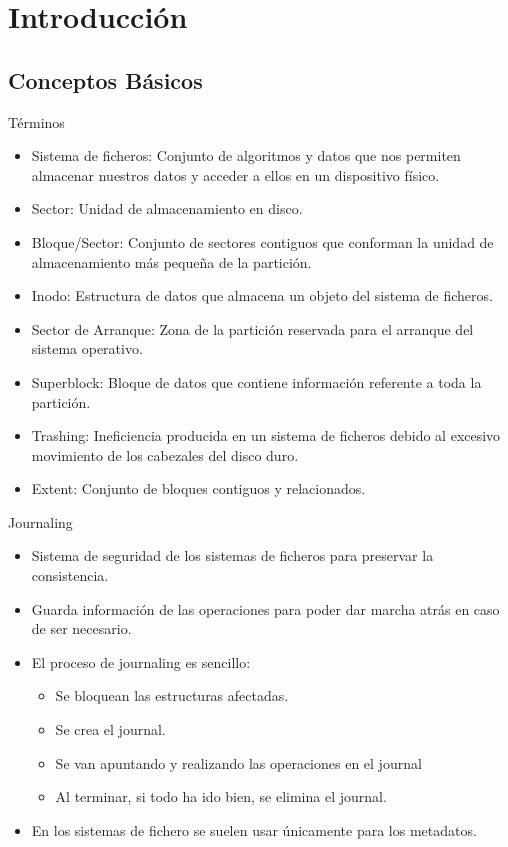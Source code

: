 \section*{Introducción}
\subsection*{Conceptos Básicos}
\begin{frame}{Términos}
  \begin{itemize}
    \item Sistema de ficheros: Conjunto de algoritmos y datos que nos permiten almacenar nuestros datos y acceder a ellos en un dispositivo físico.
    \item Sector: Unidad de almacenamiento en disco.
    \item Bloque/Sector: Conjunto de sectores contiguos que conforman la unidad de almacenamiento más pequeña de la partición.
    \item Inodo: Estructura de datos que almacena un objeto del sistema de ficheros.
    \item Sector de Arranque: Zona de la partición reservada para el arranque del sistema operativo.
    \item Superblock: Bloque de datos que contiene información referente a toda la partición.
    \item Trashing: Ineficiencia producida en un sistema de ficheros debido al excesivo movimiento de los cabezales del disco duro.
    \item Extent: Conjunto de bloques contiguos y relacionados.
  \end{itemize}
\end{frame}

\begin{frame}{Journaling}
  \begin{itemize}
    \item Sistema de seguridad de los sistemas de ficheros para preservar la consistencia.
    \item Guarda información de las operaciones para poder dar marcha atrás en caso de ser necesario.
    \item El proceso de journaling es sencillo:
    \begin{itemize}
      \item Se bloquean las estructuras afectadas.
      \item Se crea el journal.
      \item Se van apuntando y realizando las operaciones en el journal
      \item Al terminar, si todo ha ido bien, se elimina el journal.
    \end{itemize}
    \item En los sistemas de fichero se suelen usar únicamente para los metadatos.
  \end{itemize}
\end{frame}

